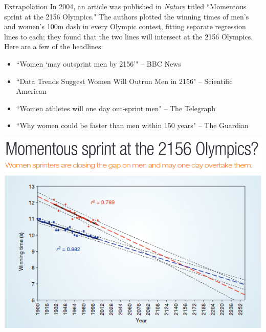 \documentclass{beamer}
\begin{document}
\begin{frame}{Extrapolation}
\footnotesize
In 2004, an article was published in \textit{Nature} titled ``Momentous sprint at the 2156 Olympics." The authors plotted the winning times of men's and women's 100m dash in every Olympic contest, fitting separate regression lines to each; they found that the two lines will intersect at the 2156 Olympics. Here are a few of the headlines: \\
\vspace{3mm}
\begin{itemize}
\item ``Women `may outsprint men by 2156'" -- BBC News
\item ``Data Trends Suggest Women Will Outrun Men in 2156" -- Scientific American
\item ``Women athletes will one day out-sprint men" -- The Telegraph
\item ``Why women could be faster than men within 150 years" -- The Guardian
\end{itemize}


\end{frame}

\begin{frame}
\begin{center}
\includegraphics[scale=0.25]{nature_headline.png}
\includegraphics[scale=0.5]{nature_plot.png}
\end{center}
\end{frame}
\end{document}
